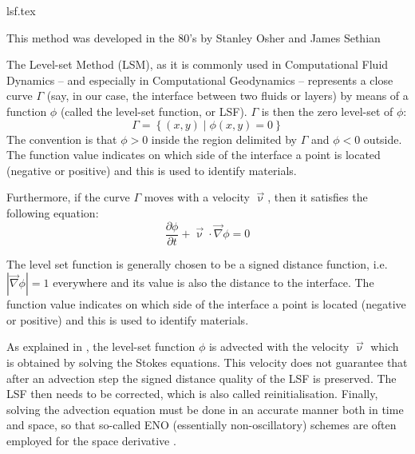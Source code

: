 \begin{flushright} {\tiny {\color{gray} lsf.tex}} \end{flushright}

This method was developed in the 80's by Stanley Osher and James Sethian \cite{lofo06}

The Level-set Method (LSM), as it is commonly used in Computational Fluid Dynamics -- and especially 
in Computational Geodynamics -- represents a close curve $\Gamma$ (say, in our case, the 
interface between two fluids or layers) by means of a function $\phi$ (called the level-set function, or LSF).
$\Gamma$ is then the zero level-set of $\phi$:
\begin{equation}
\Gamma = \left\{ (x,y) \; |\; \phi(x,y)=0 \right\}
\end{equation}
The convention is that $\phi>0$ inside the region delimited by $\Gamma$ and $\phi<0$ outside.
The function value indicates on which side of the
interface a point is located (negative or positive) and this is
used to identify materials. 

Furthermore, if the curve $\Gamma$ moves with a velocity $\vec \upnu$, 
then it satisfies the following equation:
\begin{equation}
\frac{\partial \phi}{\partial t} + \vec\upnu \cdot \vec\nabla \phi = 0 
\end{equation}

The level set function is generally chosen to
be a signed distance function, i.e. $|\vec\nabla \phi| = 1$ everywhere 
and its value is also the distance to the interface.
The function value indicates on which side of the interface a
point is located (negative or positive) and this is used to identify materials.

As explained in \cite{hitg14}, the level-set function $\phi$ is advected 
with the velocity $\vec\upnu$ which is obtained by solving the Stokes equations.
This velocity does not guarantee that after an advection step the signed 
distance quality of the LSF is preserved. 
The LSF then needs to be corrected, which is also called reinitialisation. 
Finally, solving the advection equation must be done in an accurate manner both in time and space,
so that so-called ENO (essentially non-oscillatory) schemes are often employed for the 
space derivative \cite{ossh91,saev10}.


